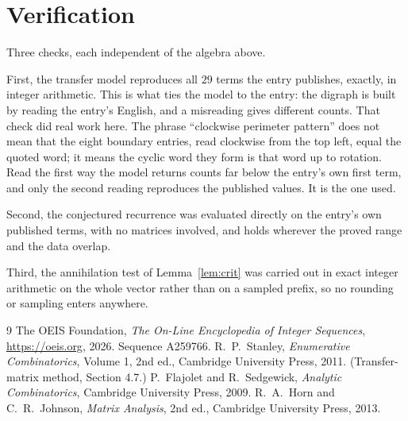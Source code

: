 \documentclass[11pt,a4paper]{article}
\theoremstyle{plain}
\theoremstyle{definition}
\begin{document}
\section{Verification}

Three checks, each independent of the algebra above.

First, the transfer model reproduces all $29$ terms the entry publishes, exactly, in
integer arithmetic. This is what ties the model to the entry: the digraph is built by reading
the entry's English, and a misreading gives different counts. That check did real work here. The phrase ``clockwise perimeter pattern'' does not mean that the eight boundary entries, read clockwise from the top left, equal the quoted word; it means the cyclic word they form is that word up to rotation. Read the first way the model returns counts far below the entry's own first term, and only the second reading reproduces the published values. It is the one used.

Second, the conjectured recurrence was evaluated directly on the entry's own published terms,
with no matrices involved, and holds wherever the proved range and the data overlap.

Third, the annihilation test of Lemma~\ref{lem:crit} was carried out in exact integer
arithmetic on the whole vector rather than on a sampled prefix, so no rounding or sampling
enters anywhere.

\begin{thebibliography}{9}
 The OEIS Foundation, \emph{The On-Line Encyclopedia of Integer
Sequences}, \url{https://oeis.org}, 2026. Sequence A259766.
 R.~P.~Stanley, \emph{Enumerative Combinatorics}, Volume 1, 2nd ed.,
Cambridge University Press, 2011. (Transfer-matrix method, Section 4.7.)
 P.~Flajolet and R.~Sedgewick, \emph{Analytic Combinatorics}, Cambridge
University Press, 2009.
 R.~A.~Horn and C.~R.~Johnson, \emph{Matrix Analysis}, 2nd ed., Cambridge
University Press, 2013.
\end{thebibliography}
\end{document}
